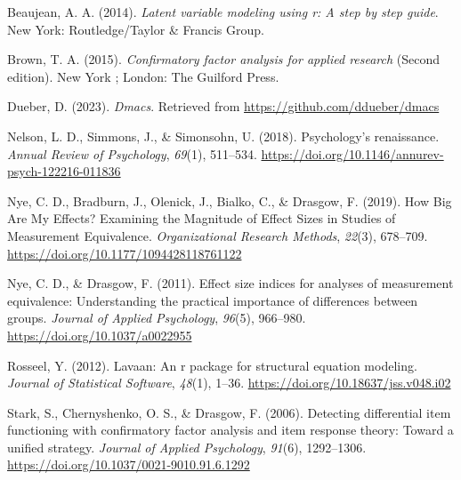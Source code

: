 \documentclass[
  man]{apa6}
\newlength{\cslhangindent}
\newlength{\cslentryspacingunit} %
\newenvironment{CSLReferences}[2] %
 {%
  \setlength{\parindent}{0pt}
  \ifodd #1
  \let\oldpar\par
  \def\par{\hangindent=\cslhangindent\oldpar}
  \fi
  \setlength{\parskip}{#2\cslentryspacingunit}
 }%
 {}
\begin{document}
\hypertarget{refs}{}
\begin{CSLReferences}{1}{0}
\leavevmode{}%
Beaujean, A. A. (2014). \emph{Latent variable modeling using r: A step by step guide}. New York: Routledge/Taylor \& Francis Group.

\leavevmode{}%
Brown, T. A. (2015). \emph{Confirmatory factor analysis for applied research} (Second edition). New York ; London: The Guilford Press.

\leavevmode{}%
Dueber, D. (2023). \emph{Dmacs}. Retrieved from \url{https://github.com/ddueber/dmacs}

\leavevmode{}%
Nelson, L. D., Simmons, J., \& Simonsohn, U. (2018). Psychology's renaissance. \emph{Annual Review of Psychology}, \emph{69}(1), 511--534. \url{https://doi.org/10.1146/annurev-psych-122216-011836}

\leavevmode{}%
Nye, C. D., Bradburn, J., Olenick, J., Bialko, C., \& Drasgow, F. (2019). How Big Are My Effects? Examining the Magnitude of Effect Sizes in Studies of Measurement Equivalence. \emph{Organizational Research Methods}, \emph{22}(3), 678--709. \url{https://doi.org/10.1177/1094428118761122}

\leavevmode{}%
Nye, C. D., \& Drasgow, F. (2011). Effect size indices for analyses of measurement equivalence: Understanding the practical importance of differences between groups. \emph{Journal of Applied Psychology}, \emph{96}(5), 966--980. \url{https://doi.org/10.1037/a0022955}

\leavevmode{}%
Rosseel, Y. (2012). Lavaan: An r package for structural equation modeling. \emph{Journal of Statistical Software}, \emph{48}(1), 1--36. \url{https://doi.org/10.18637/jss.v048.i02}

\leavevmode{}%
Stark, S., Chernyshenko, O. S., \& Drasgow, F. (2006). Detecting differential item functioning with confirmatory factor analysis and item response theory: Toward a unified strategy. \emph{Journal of Applied Psychology}, \emph{91}(6), 1292--1306. \url{https://doi.org/10.1037/0021-9010.91.6.1292}

\end{CSLReferences}

\newpage
\end{document}
